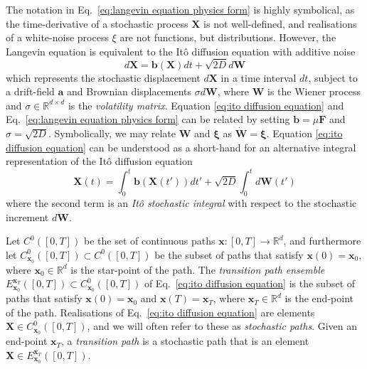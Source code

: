 The notation in Eq.~\ref{eq:langevin equation physics form} is highly symbolical, as the time-derivative of a stochastic process $\mathbf{X}$ is not well-defined, and realisations of a white-noise process $\xi$ are not functions, but distributions. However, the Langevin equation is equivalent to the It\^{o} diffusion equation with additive noise
\begin{equation} \label{eq:ito diffusion equation}
d \mathbf{X} = \mathbf{b}(\mathbf{X}) dt + \sqrt{2D} d \mathbf{W}
\end{equation}
which represents the stochastic displacement $d\mathbf{X}$ in a time
interval $dt$, subject to a drift-field $\mathbf{a}$ and Brownian displacements $\sigma d\mathbf{W}$, where $\mathbf{W}$ is the Wiener process and $\sigma \in \mathbb{R}^{d \times d}$ is the \textit{volatility matrix}. Equation \ref{eq:ito diffusion equation} and Eq.~\ref{eq:langevin equation physics form} can be related by setting $\mathbf{b} = \mu \mathbf{F}$ and $\sigma = \sqrt{2 D}$. Symbolically, we may relate $\mathbf{W}$ and $\boldsymbol{\xi}$ as $\dot{\mathbf{W}} = \boldsymbol{\xi}$. Equation \ref{eq:ito diffusion equation} can be understood as a short-hand for an alternative integral representation of the It\^{o} diffusion equation  
\begin{equation}
\mathbf{X}(t) = \int_0^t \mathbf{b}(\mathbf{X}(t')) dt' + \sqrt{2D} \int_0^{t} d \mathbf{W}(t')
\end{equation}
where the second term is an \textit{It\^{o} stochastic integral} \citep{oksendalStochasticDifferentialEquations2003, shreveStochasticCalculusFinance2005} with respect to the stochastic increment $d \mathbf{W}$.

Let $C^0([0,T])$ be the set of continuous paths $\mathbf{x} : [0, T] \to \mathbb{R}^d$, and furthermore let $C_{\mathbf{x}_0}^0([0,T]) \subset C^0([0,T])$ be the subset of paths that satisfy $\mathbf{x}(0) = \mathbf{x}_0$, where $\mathbf{x}_0 \in \mathbb{R}^d$ is the star-point of the path. The \textit{transition path ensemble} $E_{\mathbf{x}_0}^{\mathbf{x}_T}([0,T]) \subset C_{\mathbf{x}_0}^0([0,T])$ of Eq.~\ref{eq:ito diffusion equation} is the subset of paths that satisfy $\mathbf{x}(0) = \mathbf{x}_0$ and $\mathbf{x}(T) = \mathbf{x}_T$, where $\mathbf{x}_T \in \mathbb{R}^d$ is the end-point of the path. Realisations of Eq.~\ref{eq:ito diffusion equation} are elements $\mathbf{X} \in C_{\mathbf{x}_0}^0([0,T])$, and we will often refer to these as \textit{stochastic paths}. Given an end-point $\mathbf{x}_T$, a \textit{transition path} is a stochastic path that is an element $\mathbf{X} \in E_{\mathbf{x}_0}^{\mathbf{x}_T}([0,T])$.

